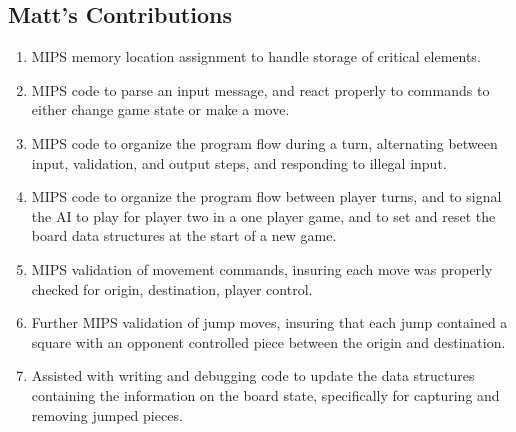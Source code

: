 \documentclass[]{article}
\begin{document}
\subsection*{Matt's Contributions}
\begin{enumerate}
\item MIPS memory location assignment to handle storage of critical elements.

\item MIPS code to parse an input message, and react properly to commands to either change game state or make a move.

\item MIPS code to organize the program flow during a turn, alternating between input, validation, and output steps, and responding to illegal input.

\item MIPS code to organize the program flow between player turns, and to signal the AI to play for player two in a one player game, and to set and reset the board data structures at the start of a new game.

\item MIPS validation of movement commands, insuring each move was properly checked for origin, destination, player control.

\item Further MIPS validation of jump moves, insuring that each jump contained a square with an opponent controlled piece between the origin and destination.

\item Assisted with writing and debugging code to update the data structures containing the information on the board state, specifically for capturing and removing jumped pieces.
\end{enumerate}
\end{document}
